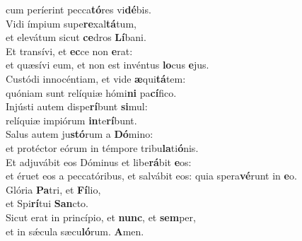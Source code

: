 \evenverse cum períerint pecca\textbf{tó}res vi\textbf{dé}bis.\\
\oddverse Vidi ímpium supe\textbf{re}xal\textbf{tá}tum,~\*\\
\oddverse et elevátum sicut \textbf{ce}dros \textbf{Lí}bani.\\
\evenverse Et transívi, et \textbf{ec}ce non \textbf{e}rat:~\*\\
\evenverse et quæsívi eum, et non est invéntus \textbf{lo}cus \textbf{e}jus.\\
\oddverse Custódi innocéntiam, et vide \textbf{æ}qui\textbf{tá}tem:~\*\\
\oddverse quóniam sunt relíquiæ hómi\textbf{ni} pa\textbf{cí}fico.\\
\evenverse Injústi autem dispe\textbf{rí}bunt \textbf{si}mul:~\*\\
\evenverse relíquiæ impiórum \textbf{in}te\textbf{rí}bunt.\\
\oddverse Salus autem ju\textbf{stó}rum a \textbf{Dó}mino:~\*\\
\oddverse et protéctor eórum in témpore tribu\textbf{la}ti\textbf{ó}nis.\\
\evenverse Et adjuvábit eos Dóminus et libe\textbf{rá}bit \textbf{e}os:~\*\\
\evenverse et éruet eos a peccatóribus, et salvábit eos: quia spera\textbf{vé}runt in \textbf{e}o.\\
\oddverse Glória \textbf{Pa}tri, et \textbf{Fí}lio,~\*\\
\oddverse et Spi\textbf{rí}tui \textbf{San}cto.\\
\evenverse Sicut erat in princípio, et \textbf{nunc}, et \textbf{sem}per,~\*\\
\evenverse et in sǽcula sæcu\textbf{ló}rum. \textbf{A}men.\\
